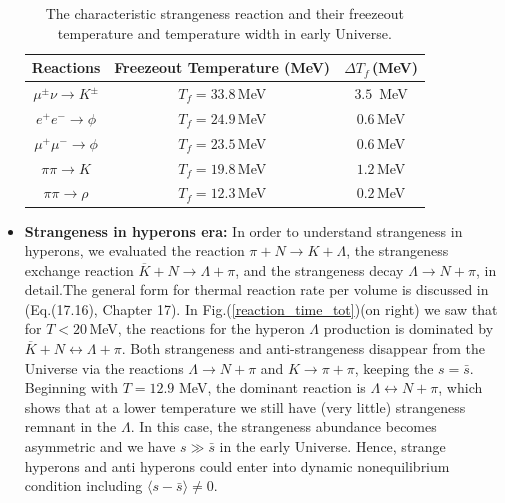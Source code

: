 \documentclass[universe,article,submit,moreauthors,pdftex,a4paper]{Definitions/mdpi}
\begin{document}
\begin{itemize}
\begin{table}%
\caption{The characteristic strangeness reaction and their freezeout temperature and temperature width in early Universe.}
\label{FreezeoutTemperature_table} 
\centering
\begin{tabular}{c| c| c}
\hline\hline
Reactions &Freezeout Temperature (MeV) & {$\Delta T_f$\,(MeV)} \\
\hline
$\mu^\pm\nu\rightarrow K^\pm$ & $T_f=33.8$\,MeV & {$3.5$ \,MeV}\\ 
\hline
$e^+e^-\rightarrow \phi$ & $T_f=24.9$\,MeV &{$0.6$\,MeV}\\
$\mu^+\mu^-\rightarrow\phi$ & $T_f=23.5$\,MeV &{$0.6$\,MeV}\\
\hline
 $\pi\pi\rightarrow K$ & $T_f=19.8$\,MeV&{$1.2$\,MeV}\\
\hline
$\pi\pi\rightarrow\rho$ & $T_f=12.3$\,MeV&{$0.2$\,MeV}\\
\hline\hline
\end{tabular}
\end{table}



\item \textbf{Strangeness in hyperons era:}
In order to understand strangeness in hyperons, we evaluated the reaction $\pi +N\rightarrow K+\Lambda$, the strangeness exchange reaction $\overline{K}+N\rightarrow \Lambda+\pi$, and the strangeness decay $\Lambda\rightarrow N+\pi$, in detail.The general form for thermal reaction rate per volume is discussed in~\cite{Letessier:2002gp} (Eq.(17.16), Chapter 17). In Fig.(\ref{reaction_time_tot})(on right) we saw that for $T<20$\,MeV, the reactions for the hyperon $\Lambda$ production is dominated by $\overline{K}+N\leftrightarrow\Lambda+\pi$. Both strangeness and anti-strangeness disappear from the Universe via the reactions $\Lambda\rightarrow N+\pi$ and $K\to\pi+\pi$, keeping the $s=\bar s$. Beginning with $T=12.9$ MeV, the dominant reaction is $\Lambda\leftrightarrow N+\pi$, which shows that at a lower temperature we still have (very little) strangeness remnant in the $\Lambda$. In this case, the strangeness abundance becomes asymmetric and we have $s\gg\bar{s}$ in the early Universe. Hence, strange hyperons and anti hyperons could enter into dynamic nonequilibrium condition including $\langle s-\bar s\rangle \ne 0$.
\end{itemize}
\end{document}
